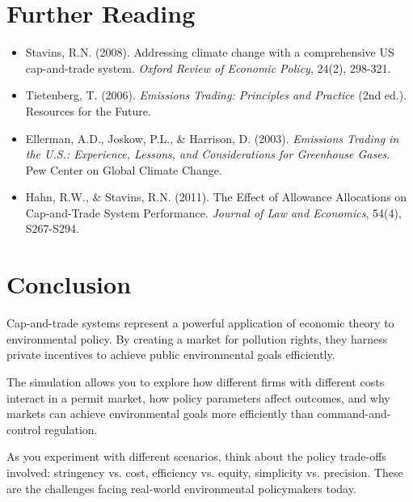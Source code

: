 \documentclass{tufte-handout}\usepackage[]{graphicx}\usepackage[]{xcolor}
\begin{document}
\section{Further Reading}

\begin{itemize}
\item Stavins, R.N. (2008). Addressing climate change with a comprehensive US cap-and-trade system. \textit{Oxford Review of Economic Policy}, 24(2), 298-321.

\item Tietenberg, T. (2006). \textit{Emissions Trading: Principles and Practice} (2nd ed.). Resources for the Future.

\item Ellerman, A.D., Joskow, P.L., \& Harrison, D. (2003). \textit{Emissions Trading in the U.S.: Experience, Lessons, and Considerations for Greenhouse Gases}. Pew Center on Global Climate Change.

\item Hahn, R.W., \& Stavins, R.N. (2011). The Effect of Allowance Allocations on Cap-and-Trade System Performance. \textit{Journal of Law and Economics}, 54(4), S267-S294.
\end{itemize}

\section{Conclusion}

Cap-and-trade systems represent a powerful application of economic theory to environmental policy. By creating a market for pollution rights, they harness private incentives to achieve public environmental goals efficiently.

The simulation allows you to explore how different firms with different costs interact in a permit market, how policy parameters affect outcomes, and why markets can achieve environmental goals more efficiently than command-and-control regulation.


As you experiment with different scenarios, think about the policy trade-offs involved: stringency vs. cost, efficiency vs. equity, simplicity vs. precision. These are the challenges facing real-world environmental policymakers today.
\end{document}
